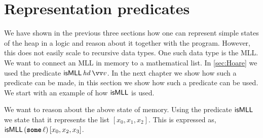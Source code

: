\documentclass[thesis.tex]{subfiles}
\begin{document}
\section{Representation predicates}
\label{sec:represpreds}
We have shown in the previous three sections how one can represent simple states of the heap in a logic and reason about it together with the program. However, this does not easily scale to recursive data types. One such data type is the MLL. We want to connect an MLL in memory to a mathematical list. In \cref*{sec:Hoare} we used the predicate $\isMLL\, \langv{hd}\, \vect{v}$. In the next chapter we show how such a predicate can be made, in this section we show how such a predicate can be used. We start with an example of how $\textsf{\upshape isMLL}$ is used.
\begin{center}
\end{center}
We want to reason about the above state of memory. Using the predicate $\textsf{\upshape isMLL}$ we state that it represents the list $[x_0, x_1, x_2]$. This is expressed as, $\textsf{\upshape isMLL}\,(\operatorname{\texttt{\bfseries some}}\ell)\,[x_0,x_2,x_3]$.
\end{document}
